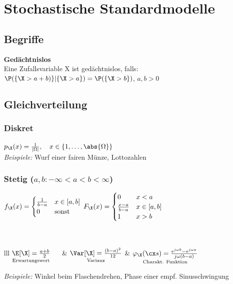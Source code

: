 \documentclass[german,color,6pt]{latex4ei/latex4ei_sheet}
\begin{document}
\section{Stochastische Standardmodelle}
\begin{sectionbox}
	\subsection{Begriffe}
	\textbf{Gedächtnislos}\\
	Eine Zufallsvariable X ist gedächtnislos, falls: \\
	$\P(\{\X > a + b)\} | \{\X > a\}) = \P(\{\X > b\})$, \qquad $a,b > 0$

\end{sectionbox}
\begin{sectionbox}
	\subsection{Gleichverteilung}
	\subsubsection{Diskret}
	$p_{\X}(x) = \frac{1}{|\Omega|}, \quad x \in \left\{1,\dots,\abs{\Omega}\right\}$\\
	\emph{Beispiele:} Wurf einer fairen Münze, Lottozahlen

	\subsubsection{Stetig ($a,b: -\infty < a < b < \infty$)}
	$f_{\X}(x) = \begin{cases}
	\frac{1}{b - a} & x \in [a,b] \\
	0 & \text{sonst} \\
	\end{cases}$
	\qquad
	$F_{\X}(x) = \begin{cases}
	0 & x < a \\
	\frac{x-a}{b - a} & x \in [a,b] \\
	1 & x > b \\
	\end{cases}$
	\\ \\  \\
	\everymath{\displaystyle}
	\begin{tablebox}{lll}
		$\underset{\text{Erwartungswert}}{\E[\X] =\frac{a+b}{2}}\quad\ $ & $\underset{\text{Varianz}}{\Var[\X] =\frac{(b-a)^2}{12}}$ & $\underset{\text{Charakt. Funktion}}{\varphi_{\X}(\cx s) = \frac{e^{j \omega b}-e^{j \omega a}}{j \omega (b-a)}}$\\
	\end{tablebox}
	\emph{Beispiele:} Winkel beim Flaschendrehen, Phase einer empf. Sinusschwingung

\end{sectionbox}
\end{document}
